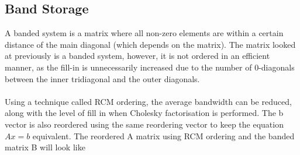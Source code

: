 \documentclass[12pt,a4paper]{article}
\begin{document}
\subsection{Band Storage}
A banded system is a matrix where all non-zero elements are within a certain distance of the main diagonal (which depends on the matrix). The matrix looked at previously is a banded system, however, it is not ordered in an efficient manner, as the fill-in is unnecessarily increased due to the number of 0-diagonals between the inner tridiagonal and the outer diagonals. \\\\Using a technique called RCM ordering, the average bandwidth can be reduced, along with the level of fill in when Cholesky factorisation is performed. The b vector is also reordered using the same reordering vector to keep the equation $Ax=b$ equivalent. The reordered A matrix using RCM ordering and the banded matrix B will look like
\end{document}
